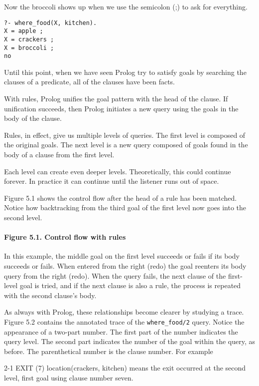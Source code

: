 Now the broccoli shows up when we use the semicolon (;) to ask for everything.

\begin{verbatim}
?- where_food(X, kitchen).
X = apple ;
X = crackers ;
X = broccoli ;
no
\end{verbatim}

Until this point, when we have seen Prolog try to satisfy goals by searching the
clauses of a predicate, all of the clauses have been facts.


With rules, Prolog unifies the goal pattern with the head of the clause. If
unification succeeds, then Prolog initiates a new query using the goals in the
body of the clause.

Rules, in effect, give us multiple levels of queries. The first level is
composed of the original goals. The next level is a new query composed of goals
found in the body of a clause from the first level.

Each level can create even deeper levels. Theoretically, this could continue
forever. In practice it can continue until the listener runs out of space.

Figure 5.1 shows the control flow after the head of a rule has been matched.
Notice how backtracking from the third goal of the first level now goes into the
second level.

\paragraph{Figure 5.1. Control flow with rules}

In this example, the middle goal on the first level succeeds or fails if its
body succeeds or fails. When entered from the right (redo) the goal reenters its
body query from the right (redo). When the query fails, the next clause of the
first-level goal is tried, and if the next clause is also a rule, the process is
repeated with the second clause's body.

As always with Prolog, these relationships become clearer by studying a trace.
Figure 5.2 contains the annotated trace of the \verb'where_food/2' query. Notice
the appearance of a two-part number. The first part of the number indicates the
query level. The second part indicates the number of the goal within the query,
as before. The parenthetical number is the clause number. For example

2-1 EXIT (7) location(crackers, kitchen)
means the exit occurred at the second level, first goal using clause number
seven.

